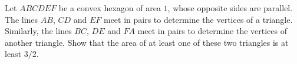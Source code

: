 Let $ABCDEF$ be a convex hexagon of area $1$, whose opposite sides are parallel. The lines $AB$, $CD$ and $EF$ meet in pairs to determine the vertices of a triangle. Similarly, the lines $BC$, $DE$ and $FA$ meet in pairs to determine the vertices of another triangle. Show that the area of at least one of these two triangles is at least $3/2$.
